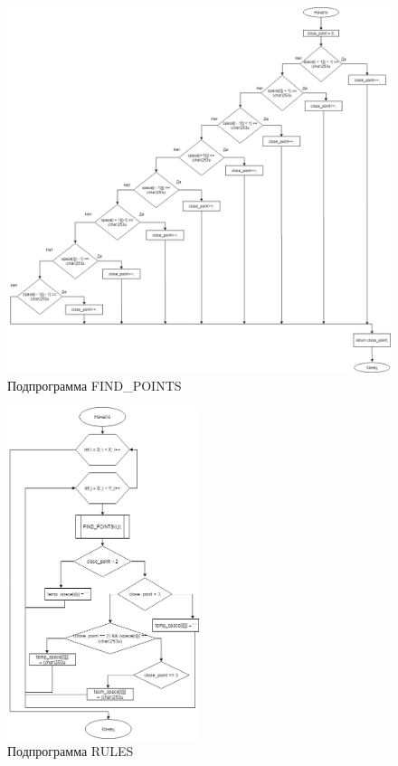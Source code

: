 \documentclass[14pt]{extarticle}
\begin{document}
\begin{figure}[!h]
  \centering
  \includegraphics[width=1\textwidth]{FINS_POINTS.png}
  \caption{Подпрограмма FIND\_POINTS}
\end{figure}
\newpage

\begin{figure}[!h]
  \centering
  \includegraphics[width=0.5\textwidth  ]{RULES.png}
  \caption{Подпрограмма RULES}
\end{figure}
\newpage
\end{document}
